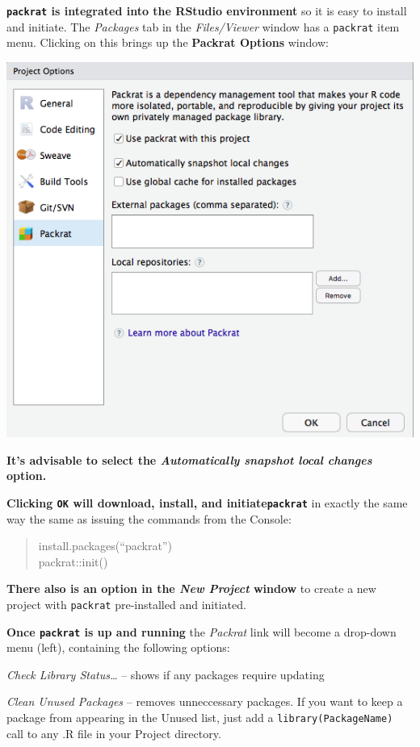 \documentclass[]{book}
\theoremstyle{definition}
\theoremstyle{definition}
\theoremstyle{definition}
\theoremstyle{remark}
\begin{document}
\textbf{\texttt{packrat} is integrated into the RStudio environment} so
it is easy to install and initiate. The \emph{Packages} tab in the
\emph{Files/Viewer} window has a \texttt{packrat} item menu. Clicking on
this brings up the \textbf{Packrat Options} window:

 \includegraphics{images/RStudio_packrat_options.png}

\textbf{It's advisable to select the \emph{Automatically snapshot local
changes} option.}

\textbf{Clicking \texttt{OK} will download, install, and
initiate\texttt{packrat}} in exactly the same way the same as issuing
the commands from the Console:

\begin{quote}
install.packages(``packrat'')\\
packrat::init()
\end{quote}

\textbf{There also is an option in the \emph{New Project} window} to
create a new project with \texttt{packrat} pre-installed and initiated.

\textbf{Once \texttt{packrat} is up and running} the \emph{Packrat} link
will become a drop-down menu (left), containing the following options:

\emph{Check Library Status\ldots{}} -- shows if any packages require
updating

\emph{Clean Unused Packages} -- removes unneccessary packages. If you
want to keep a package from appearing in the Unused list, just add a
\texttt{library(PackageName)} call to any .R file in your Project
directory.
\end{document}
